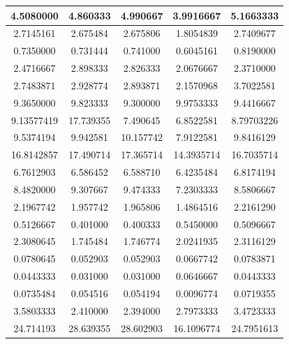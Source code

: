 \begin{longtable}{|c|c|c|c|c|}
    4.5080000 & 4.860333 & 4.990667 & 3.9916667 & 5.1663333 \\ \hline
    2.7145161 & 2.675484 & 2.675806 & 1.8054839 & 2.7409677 \\ \hline
    0.7350000 & 0.731444 & 0.741000 & 0.6045161 & 0.8190000 \\ \hline
    2.4716667 & 2.898333 & 2.826333 & 2.0676667 & 2.3710000 \\ \hline
    2.7483871 & 2.928774 & 2.893871 & 2.1570968 & 3.7022581 \\ \hline
    9.3650000 & 9.823333 & 9.300000 & 9.9753333 & 9.4416667 \\ \hline
    9.13577419 & 17.739355 & 7.490645 & 6.8522581 & 8.79703226 \\ \hline
    9.5374194 & 9.942581 & 10.157742 & 7.9122581 & 9.8416129 \\ \hline
    16.8142857 & 17.490714 & 17.365714 & 14.3935714 & 16.7035714 \\ \hline
    6.7612903  & 6.586452  & 6.588710  & 6.4235484  & 6.8174194  \\ \hline
    8.4820000  & 9.307667  & 9.474333  & 7.2303333  & 8.5806667  \\ \hline
    2.1967742  & 1.957742  & 1.965806  & 1.4864516  & 2.2161290  \\ \hline
    0.5126667  & 0.401000  & 0.400333  & 0.5450000  & 0.5096667  \\ \hline
    2.3080645  & 1.745484  & 1.746774  & 2.0241935  & 2.3116129  \\ \hline
    0.0780645  & 0.052903  & 0.052903  & 0.0667742  & 0.0783871  \\ \hline
    0.0443333  & 0.031000  & 0.031000  & 0.0646667  & 0.0443333  \\ \hline
    0.0735484  & 0.054516  & 0.054194  & 0.0096774  & 0.0719355  \\ \hline
    3.5803333  & 2.410000  & 2.394000  & 2.7973333  & 3.4723333  \\ \hline
    24.714193  & 28.639355 & 28.602903 & 16.1096774 & 24.7951613 \\ \hline
\end{longtable}